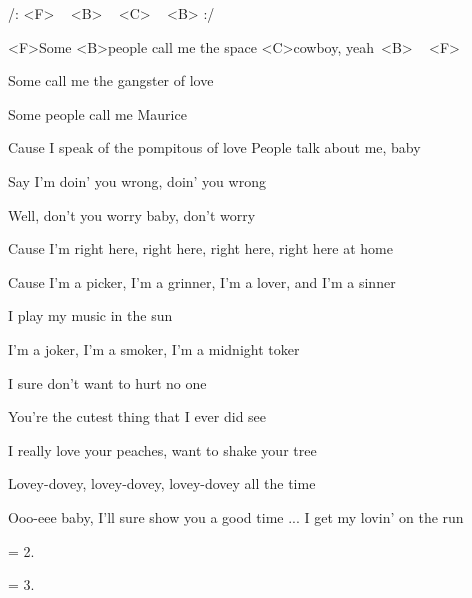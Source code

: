 
/: <F> ~ <B> ~ <C> ~ <B> :/

\zs
<F>Some <B>people call me the space <C>cowboy, yeah~<B> ~ <F>

Some call me the gangster of love

Some people call me Maurice

Cause I speak of the pompitous of love
\ks
\zs
People talk about me, baby

Say I'm doin' you wrong, doin' you wrong

Well, don't you worry baby, don't worry

Cause I'm right here, right here, right here, right here at home
\ks
\zr

Cause I'm a picker, I'm a grinner, I'm a lover, and I'm a sinner

I play my music in the sun
\bigskip

I'm a joker, I'm a smoker, I'm a midnight toker

I sure don't want to hurt no one
\kr

\zs
You're the cutest thing that I ever did see

I really love your peaches, want to shake your tree

Lovey-dovey, lovey-dovey, lovey-dovey all the time

Ooo-eee baby, I'll sure show you a good time
\ks
\zr
... I get my lovin' on the run
\kr

\zr\kr

\zs
= 2.
\ks

\zs
= 3.
\ks
\kp
